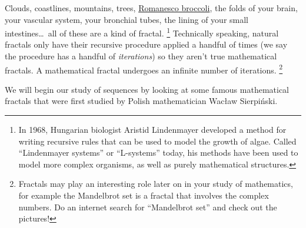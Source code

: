 Clouds, coastlines, mountains, trees, 
\href{https://www.google.com/search?q="romanesco+broccoli"&tbm=isch}{Romanesco broccoli}, 
the folds of your brain, your vascular system, your bronchial tubes, the lining of your small intestines\ldots\ all of these are a kind of fractal.
\footnote{In 1968, Hungarian biologist Aristid Lindenmayer developed a method for writing recursive rules that can be used to model the growth of algae. Called ``Lindenmayer systems'' or ``L-systems'' today, his methods have been used to model more complex organisms, as well as purely mathematical structures.} Technically speaking, natural fractals only have their recursive procedure applied a handful of times (we say the procedure has a handful of \textit{iterations}) so they aren't true mathematical fractals. A mathematical fractal undergoes an infinite number of iterations.
\footnote{Fractals may play an interesting role later on in your study of mathematics, for example the Mandelbrot set is a fractal that involves the complex numbers. Do an internet search for ``Mandelbrot set'' and check out the pictures!}

We will begin our study of sequences by looking at some famous mathematical fractals that were first studied by Polish mathematician Wac{\l}aw Sierpi\'nski.

\begin{boxedexplore}
\end{boxedexplore}

